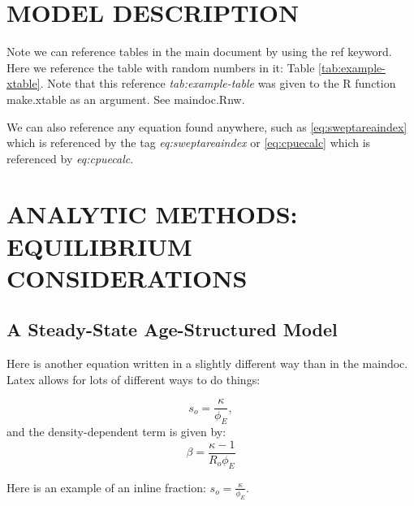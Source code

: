 \documentclass[11pt]{book}\usepackage[]{graphicx}\usepackage[]{color}
\begin{document}
\section{MODEL DESCRIPTION}

Note we can reference tables in the main document by using the ref keyword. Here we reference the table with random numbers in it: Table \ref{tab:example-xtable}. Note that this reference \emph{tab:example-table} was given to the R function make.xtable as an argument. See maindoc.Rnw.

We can also reference any equation found anywhere, such as \ref{eq:sweptareaindex} which is referenced by the tag \emph{eq:sweptareaindex} or \ref{eq:cpuecalc} which is referenced by \emph{eq:cpuecalc}.

\section{ANALYTIC METHODS: EQUILIBRIUM CONSIDERATIONS}

\subsection{A Steady-State Age-Structured Model}

Here is another equation written in a slightly different way than in the maindoc. Latex allows for lots of different ways to do things:

\[s_o=\frac{\kappa}{\phi_E},\]
and the density-dependent term is given by:
\[\beta=\frac{\kappa-1}{R_{{o}}\phi_{{E}}}\]

Here is an example of an inline fraction: $s_o=\frac{\kappa}{\phi_E}$.
\end{document}

